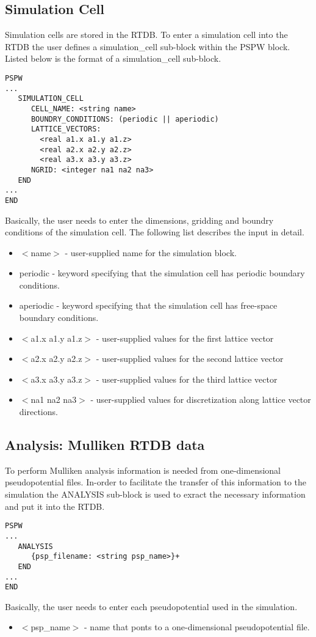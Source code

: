 \subsection{Simulation Cell}
\label{sec:pspw_cell}
Simulation cells are stored in the RTDB.  To enter a  simulation cell
into the RTDB the user defines a simulation\_cell sub-block within the PSPW 
block.  Listed below is the format of a simulation\_cell sub-block.
\begin{verbatim}
PSPW
...
   SIMULATION_CELL
      CELL_NAME: <string name>
      BOUNDRY_CONDITIONS: (periodic || aperiodic)
      LATTICE_VECTORS:
        <real a1.x a1.y a1.z>
        <real a2.x a2.y a2.z>
        <real a3.x a3.y a3.z>
      NGRID: <integer na1 na2 na3>
   END
...
END
\end{verbatim}
Basically, the user needs to enter the dimensions, gridding and boundry
conditions of the simulation cell.  The following list describes the 
input in detail.
\begin{itemize}
	\item $<$name$>$ - user-supplied name for the simulation block.
	\item periodic - keyword specifying that the simulation cell 
	                 has periodic boundary conditions. 	
	\item aperiodic - keyword specifying that the simulation cell
		          has free-space boundary conditions. 
	\item $<$a1.x a1.y a1.z$>$ - user-supplied values for the first 
				   lattice vector 
	\item $<$a2.x a2.y a2.z$>$ - user-supplied values for the second 
				   lattice vector
	\item $<$a3.x a3.y a3.z$>$ - user-supplied values for the third 
				   lattice vector
	\item $<$na1 na2 na3$>$ - user-supplied values for discretization 
				along lattice vector directions.
\end{itemize}

\subsection{Analysis: Mulliken RTDB data}
\label{sec:pspw_analysis}

To perform Mulliken analysis information is needed from one-dimensional
pseudopotential files.  In-order to facilitate the transfer of this information
to the simulation the ANALYSIS sub-block is used to exract the necessary information
and put it into the RTDB.
\begin{verbatim}
PSPW
...
   ANALYSIS
      {psp_filename: <string psp_name>}+
   END
...
END
\end{verbatim}
Basically, the user needs to enter each pseudopotential used in the simulation.
\begin{itemize}
	\item $<$psp\_name$>$ - name that ponts to a one-dimensional pseudopotential file.
\end{itemize}


